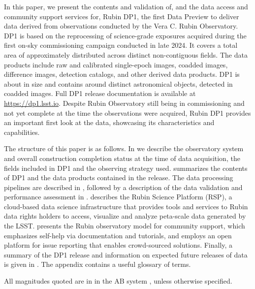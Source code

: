 In this paper, we present the contents and validation of, and the data access and community support services for, Rubin \gls{DP1}, the first Data Preview to deliver data derived from observations conducted by the Vera C. Rubin Observatory.
\gls{DP1} is based on the reprocessing of \nexposures science-grade exposures acquired 
during the first on-sky commissioning campaign conducted in late 2024.
It covers a  total area of approximately \totalarea distributed across \nfields distinct non-contiguous fields.
The data products include raw and calibrated single-\gls{epoch} images, coadded images, difference images, detection catalogs, and other derived data products.
\gls{DP1} is about \sizeinbytes in size and contains around \nobjects distinct astronomical objects, detected in \ndeepcoadds coadded images.
Full \gls{DP1} release documentation is available at \url{https://dp1.lsst.io}.
Despite Rubin Observatory still being in commissioning and not yet complete at the time the observations were acquired, Rubin \gls{DP1} provides an important first look at the data, showcasing its characteristics and capabilities.

The structure of this paper is as follows.
In  we describe the observatory system and overall construction completion status at the time of data acquisition, the \nfields fields included in \gls{DP1} and the observing strategy used.
 summarizes the contents of \gls{DP1} and the data products contained in the release.
The data processing pipelines are described in , followed by a description of the data validation and performance assessment in .
 describes the Rubin \gls{Science Platform} (RSP), a \gls{cloud}-based data science infrastructure that provides tools and services to Rubin data rights holders to access, visualize and analyze peta-scale data generated by the \gls{LSST}.
 presents the Rubin observatory model for community support, which emphasizes self-help via documentation and tutorials, and employs an open platform for  issue reporting that enables crowd-sourced solutions.
Finally, a summary of the \gls{DP1} release and information on expected future releases of data is given in .
The appendix contains a useful glossary of terms.

All magnitudes quoted are in
in the AB system \citep{1983ApJ...266..713O}, unless otherwise specified.
